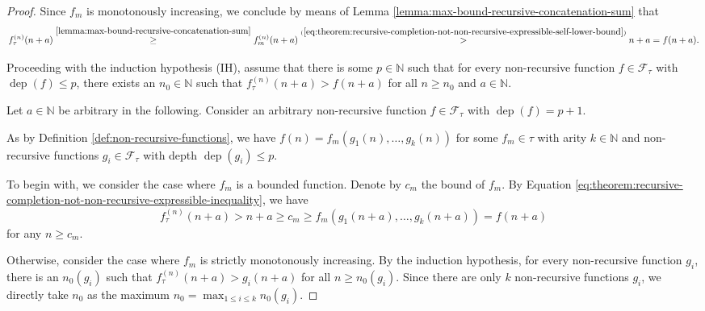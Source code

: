 \begin{proof}
	
	Since $f_m$ is monotonously increasing, we conclude by means of Lemma \ref{lemma:max-bound-recursive-concatenation-sum} that
	\begin{equation}
		\label{eq:theorem:recursive-completion-not-non-recursive-expressible-inequality}
		f_{\tau}^{(n)}(n+a)\overset{\ref{lemma:max-bound-recursive-concatenation-sum}}{\geq} f_m^{(n)}(n+a) \overset{(\ref{eq:theorem:recursive-completion-not-non-recursive-expressible-self-lower-bound})}{>} n+a = f(n+a).
	\end{equation}
	
	Proceeding with the induction hypothesis (IH), assume that there is some $p\in\mathbb{N}$ such that for every non-recursive function $f\in\mathcal{F}_{\tau}$ with $\operatorname{dep}(f)\leq p$, there exists an $n_0\in\mathbb{N}$ such that $f_\tau^{(n)}(n+a)>f(n+a)$ for all $n\geq n_0$ and $a\in\mathbb{N}$.
	
	Let $a\in\mathbb{N}$ be arbitrary in the following.
	Consider an arbitrary non-recursive function $f\in\mathcal{F}_{\tau}$ with $\operatorname{dep}(f)=p+1$.
	
	As by Definition \ref{def:non-recursive-functions}, we have $f(n)=f_m(g_1(n),\dots,g_k(n))$ for some $f_m\in\tau$ with arity $k\in\mathbb{N}$ and non-recursive functions $g_i\in \mathcal{F}_{\tau}$ with depth $\operatorname{dep}(g_i)\leq p$.
	
	To begin with, we consider the case where $f_m$ is a bounded function. Denote by $c_m$ the bound of $f_m$.
	By Equation \ref{eq:theorem:recursive-completion-not-non-recursive-expressible-inequality}, we have  
	\begin{equation}
		\label{eq:theorem:recursive-completion-not-non-recursive-expressible-induction-step-bounded}
		f_\tau^{(n)}(n+a)>n+a\geq c_m\geq f_m(g_1(n+a),\dots,g_k(n+a))=f(n+a)
	\end{equation}
	for any $n\geq c_m$.
	
	Otherwise, consider the case where $f_m$ is strictly monotonously increasing.
	By the induction hypothesis, for every non-recursive function $g_i$, there is an $n_0(g_i)$ such that $f_\tau^{(n)}(n+a)>g_i(n+a)$ for all $n\geq n_0(g_i)$.
	Since there are only $k$ non-recursive functions $g_i$, we directly take $n_0$ as the maximum $n_0 = \max_{1\leq i\leq k}n_0(g_i)$.
	

\end{proof}
